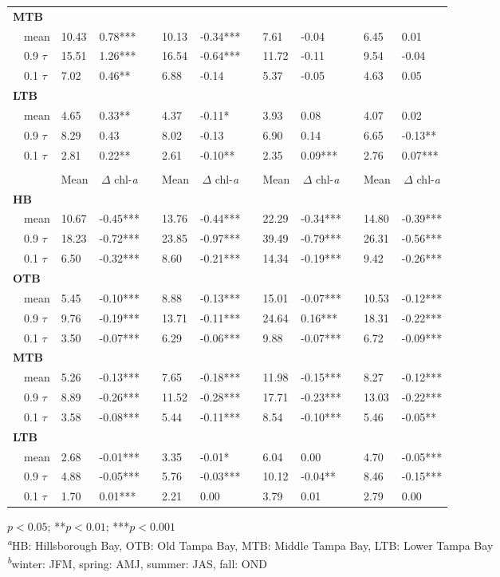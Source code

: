 \documentclass{svjour3}\usepackage[]{graphicx}\usepackage[]{color}
\begin{document}
\begin{table}[!tbp]
\begin{center}
\begin{tabular}{lllcllcllcll}
\hline
{\bfseries MTB}&&&&&&&&&&&\tabularnewline
~~mean&10.43& 0.78***&&10.13&-0.34***&& 7.61&-0.04 && 6.45& 0.01 \tabularnewline
~~0.9 $\tau$&15.51& 1.26***&&16.54&-0.64***&&11.72&-0.11 && 9.54&-0.04 \tabularnewline
~~0.1 $\tau$& 7.02& 0.46**&& 6.88&-0.14 && 5.37&-0.05 && 4.63& 0.05 \tabularnewline
\hline
{\bfseries LTB}&&&&&&&&&&&\tabularnewline
~~mean& 4.65& 0.33**&& 4.37&-0.11*&& 3.93& 0.08 && 4.07& 0.02 \tabularnewline
~~0.9 $\tau$& 8.29& 0.43 && 8.02&-0.13 && 6.90& 0.14 && 6.65&-0.13**\tabularnewline
~~0.1 $\tau$& 2.81& 0.22**&& 2.61&-0.10**&& 2.35& 0.09***&& 2.76& 0.07***\tabularnewline
\hline
{\bfseries }&&&&&&&&&&&\tabularnewline
\cline{2-3} \cline{5-6} \cline{8-9} \cline{11-12}
\multicolumn{1}{l}{}&\multicolumn{1}{c}{Mean}&\multicolumn{1}{c}{$\Delta$ chl-\textit{a}}&\multicolumn{1}{c}{}&\multicolumn{1}{c}{Mean}&\multicolumn{1}{c}{$\Delta$ chl-\textit{a}}&\multicolumn{1}{c}{}&\multicolumn{1}{c}{Mean}&\multicolumn{1}{c}{$\Delta$ chl-\textit{a}}&\multicolumn{1}{c}{}&\multicolumn{1}{c}{Mean}&\multicolumn{1}{c}{$\Delta$ chl-\textit{a}}\tabularnewline
\hline
{\bfseries HB}&&&&&&&&&&&\tabularnewline
~~mean&10.67&-0.45***&&13.76&-0.44***&&22.29&-0.34***&&14.80&-0.39***\tabularnewline
~~0.9 $\tau$&18.23&-0.72***&&23.85&-0.97***&&39.49&-0.79***&&26.31&-0.56***\tabularnewline
~~0.1 $\tau$& 6.50&-0.32***&& 8.60&-0.21***&&14.34&-0.19***&& 9.42&-0.26***\tabularnewline
\hline
{\bfseries OTB}&&&&&&&&&&&\tabularnewline
~~mean& 5.45&-0.10***&& 8.88&-0.13***&&15.01&-0.07***&&10.53&-0.12***\tabularnewline
~~0.9 $\tau$& 9.76&-0.19***&&13.71&-0.11***&&24.64& 0.16***&&18.31&-0.22***\tabularnewline
~~0.1 $\tau$& 3.50&-0.07***&& 6.29&-0.06***&& 9.88&-0.07***&& 6.72&-0.09***\tabularnewline
\hline
{\bfseries MTB}&&&&&&&&&&&\tabularnewline
~~mean& 5.26&-0.13***&& 7.65&-0.18***&&11.98&-0.15***&& 8.27&-0.12***\tabularnewline
~~0.9 $\tau$& 8.89&-0.26***&&11.52&-0.28***&&17.71&-0.23***&&13.03&-0.22***\tabularnewline
~~0.1 $\tau$& 3.58&-0.08***&& 5.44&-0.11***&& 8.54&-0.10***&& 5.46&-0.05**\tabularnewline
\hline
{\bfseries LTB}&&&&&&&&&&&\tabularnewline
~~mean& 2.68&-0.01***&& 3.35&-0.01*&& 6.04& 0.00 && 4.70&-0.05***\tabularnewline
~~0.9 $\tau$& 4.88&-0.05***&& 5.76&-0.03***&&10.12&-0.04**&& 8.46&-0.15***\tabularnewline
~~0.1 $\tau$& 1.70& 0.01***&& 2.21& 0.00 && 3.79& 0.01 && 2.79& 0.00 \tabularnewline
\hline
\end{tabular}\end{center}

\footnotesize *$p<0.05$; **$p<0.01$; ***$p<0.001$\\\textsuperscript{\textit{a}}HB: Hillsborough Bay, OTB: Old Tampa Bay, MTB: Middle Tampa Bay, LTB: Lower Tampa Bay\\\textsuperscript{\textit{b}}winter: JFM, spring: AMJ, summer: JAS, fall: OND\end{table}
\end{document}
